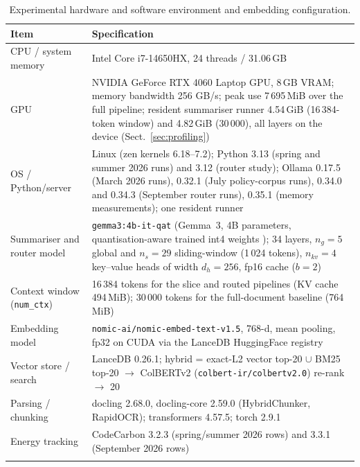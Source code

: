 \documentclass[pdflatex,sn-mathphys-num]{sn-jnl}
\theoremstyle{thmstyleone}%
\theoremstyle{thmstylethree}%
\begin{document}
\begin{table}[htbp]
\caption{Experimental hardware and software environment and embedding configuration.}\label{tab:hardware}
\begin{tabular}{@{}p{3.2cm}p{9.4cm}@{}}
\toprule
Item & Specification \\
\midrule
CPU / system memory & Intel Core i7-14650HX, 24 threads / 31.06\,GB \\
GPU & NVIDIA GeForce RTX 4060 Laptop GPU, 8\,GB VRAM; memory bandwidth 256 GB/s; peak use 7\,695\,MiB over the full pipeline; resident summariser runner 4.54\,GiB (16\,384-token window) and 4.82\,GiB (30\,000), all layers on the device (Sect.~\ref{sec:profiling}) \\
OS / Python/server & Linux (zen kernels 6.18--7.2); Python 3.13 (spring and summer 2026 runs) and 3.12 (router study); Ollama 0.17.5 (March 2026 runs), 0.32.1 (July policy-corpus runs), 0.34.0 and 0.34.3 (September router runs), 0.35.1 (memory measurements); one resident runner \\
Summariser and router model & \texttt{gemma3:4b-it-qat} (Gemma~3, 4B parameters, quantisation-aware trained int4 weights \cite{gemma3report2025,jacob2018quantization}); 34 layers, $n_g=5$ global and $n_s=29$ sliding-window (1\,024 tokens), $n_{kv}=4$ key--value heads of width $d_h=256$, fp16 cache ($b=2$) \\
Context window (\texttt{num\_ctx}) & 16\,384 tokens for the slice and routed pipelines (KV cache 494\,MiB); 30\,000 tokens for the full-document baseline (764\,MiB) \\
Embedding model & \texttt{nomic-ai/nomic-embed-text-v1.5}, 768-d, mean pooling, fp32 on CUDA via the LanceDB HuggingFace registry \\
Vector store / search & LanceDB 0.26.1; hybrid = exact-L2 vector top-20 $\cup$ BM25 top-20 $\rightarrow$ ColBERTv2 (\texttt{colbert-ir/colbertv2.0}) re-rank $\rightarrow$ 20 \\
Parsing / chunking & docling 2.68.0, docling-core 2.59.0 (HybridChunker, RapidOCR); transformers 4.57.5; torch 2.9.1 \\
Energy tracking & CodeCarbon 3.2.3 (spring/summer 2026 rows) and 3.3.1 (September 2026 rows) \\
\botrule
\end{tabular}

\end{table}
\end{document}
